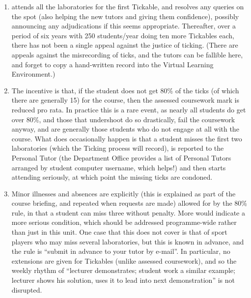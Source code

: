 \documentclass[conference,compsoc]{IEEEtran}
\begin{document}
\begin{enumerate}
\item \JHD{} attends all the laboratories for the first Tickable, and resolves any queries on the spot (also helping the new tutors and giving them confidence), possibly announcing any adjudications if this seems appropriate. Thereafter, over a period of six years with 250 students/year doing ten more Tickables each, there has not been a single appeal against the justice of ticking. (There are appeals against the misrecording of ticks, and the tutors can be fallible here, and forget to copy a hand-written record into the Virtual Learning Environment.)
\item  The incentive is that, if the student does not get 80\% of the ticks (of which there are generally 15) for the course, then the assessed coursework mark is reduced pro rata. In practice this is a rare event, as nearly all students do get over 80\%, and those that undershoot do so drastically, fail the coursework anyway, and are generally those students who do not engage at all with the course. What does occasionally happen is that a student misses the first two laboratories (which the Ticking process will record), is reported to the Personal Tutor (the Department Office provides a list of Personal Tutors arranged by student computer username, which helps!) and then starts attending seriously, at which point the missing ticks are condoned.
\item Minor illnesses and absences are explicitly (this is explained as part of the course briefing, and repeated when requests are made) allowed for by the 80\% rule, in that a student can miss three without penalty. More would indicate a more serious condition, which should be addressed programme-wide rather than just in this unit. One case that this does not cover is that of sport players who may miss several laboratories, but this is known in advance, and the rule is ``submit in advance to your tutor by e-mail''. In particular, no extensions are given for Tickables (unlike assessed coursework), and so the weekly rhythm of ``lecturer demonstrates; student work a similar example; lecturer shows his solution, uses it to lead into next demonstration'' is not disrupted.
\end{enumerate}
\end{document}
